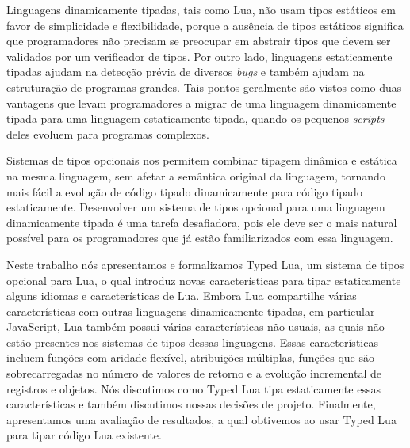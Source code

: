 Linguagens dinamicamente tipadas, tais como Lua, não usam tipos estáticos em
favor de simplicidade e flexibilidade, porque a ausência de tipos estáticos
significa que programadores não precisam se preocupar em abstrair tipos que
devem ser validados por um verificador de tipos.
Por outro lado, linguagens estaticamente tipadas ajudam na detecção prévia de
diversos \emph{bugs} e também ajudam na estruturação de programas grandes.
Tais pontos geralmente são vistos como duas vantagens que levam programadores
a migrar de uma linguagem dinamicamente tipada para uma linguagem estaticamente tipada,
quando os pequenos \emph{scripts} deles evoluem para programas complexos.

Sistemas de tipos opcionais nos permitem combinar tipagem dinâmica e estática na
mesma linguagem, sem afetar a semântica original da linguagem, tornando mais
fácil a evolução de código tipado dinamicamente para código tipado estaticamente.
Desenvolver um sistema de tipos opcional para uma linguagem dinamicamente tipada é
uma tarefa desafiadora, pois ele deve ser o mais natural possível para os programadores
que já estão familiarizados com essa linguagem.

Neste trabalho nós apresentamos e formalizamos Typed Lua, um sistema de tipos opcional
para Lua, o qual introduz novas características para tipar estaticamente alguns idiomas
e características de Lua.
Embora Lua compartilhe várias características com outras linguagens dinamicamente
tipadas, em particular JavaScript, Lua também possui várias características não usuais,
as quais não estão presentes nos sistemas de tipos dessas linguagens.
Essas características incluem funções com aridade flexível, atribuições múltiplas,
funções que são sobrecarregadas no número de valores de retorno e
a evolução incremental de registros e objetos.
Nós discutimos como Typed Lua tipa estaticamente essas características e
também discutimos nossas decisões de projeto.
Finalmente, apresentamos uma avaliação de resultados,
a qual obtivemos ao usar Typed Lua para tipar código Lua existente.
